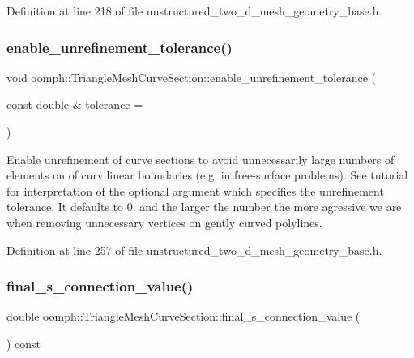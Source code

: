 Definition at line 218 of file unstructured\+\_\+two\+\_\+d\+\_\+mesh\+\_\+geometry\+\_\+base.\+h.

\mbox{\label{classoomph_1_1TriangleMeshCurveSection_ac01b9768242eee89888b3cf1960ab226}} 
\subsubsection{\texorpdfstring{enable\+\_\+unrefinement\+\_\+tolerance()}{enable\_unrefinement\_tolerance()}}
{\footnotesize\ttfamily void oomph\+::\+Triangle\+Mesh\+Curve\+Section\+::enable\+\_\+unrefinement\+\_\+tolerance (\begin{DoxyParamCaption}\item[{const double \&}]{tolerance = {} }\end{DoxyParamCaption})\hspace{0.3cm}{\ttfamily [inline]}}



Enable unrefinement of curve sections to avoid unnecessarily large numbers of elements on of curvilinear boundaries (e.\+g. in free-\/surface problems). See tutorial for interpretation of the optional argument which specifies the unrefinement tolerance. It defaults to 0. and the larger the number the more agressive we are when removing unnecessary vertices on gently curved polylines. 



Definition at line 257 of file unstructured\+\_\+two\+\_\+d\+\_\+mesh\+\_\+geometry\+\_\+base.\+h.

\mbox{\label{classoomph_1_1TriangleMeshCurveSection_a221faf0fec4d8b67dede9a90ce15fc41}} 
\subsubsection{\texorpdfstring{final\+\_\+s\+\_\+connection\+\_\+value()}{final\_s\_connection\_value()}\hspace{0.1cm}{\footnotesize\ttfamily [1/2]}}
{\footnotesize\ttfamily double oomph\+::\+Triangle\+Mesh\+Curve\+Section\+::final\+\_\+s\+\_\+connection\+\_\+value (\begin{DoxyParamCaption}{ }\end{DoxyParamCaption}) const\hspace{0.3cm}{\ttfamily [inline]}}



